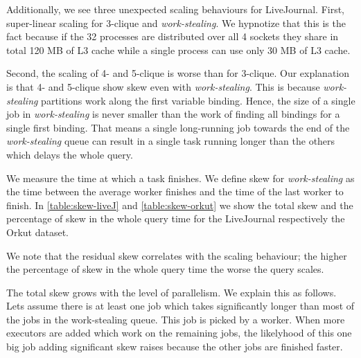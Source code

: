 Additionally, we see three unexpected scaling behaviours for LiveJournal.
First, super-linear scaling for 3-clique and \textit{work-stealing}.
We hypnotize that this is the fact because if the 32 processes are distributed over all 4 sockets they share in total
120 MB of L3 cache while a single process can use only 30 MB of L3 cache.

Second, the scaling of 4- and 5-clique is worse than for 3-clique.
Our explanation is that 4- and 5-clique show skew even with \textit{work-stealing}.
%
This is because \textit{work-stealing} partitions work along the first variable binding.
Hence, the size of a single job in \textit{work-stealing} is never smaller than the work of finding all bindings for a single
first binding.
That means a single long-running job towards the end of the \textit{work-stealing} queue can
result in a single task running longer than the others which delays the whole query.

We measure the time at which a task finishes.
We define skew for \textit{work-stealing} as the time between the average worker finishes and
the time of the last worker to finish.
In \cref{table:skew-liveJ} and \cref{table:skew-orkut} we show the total skew and the percentage of
skew in the whole query time for the LiveJournal respectively the Orkut dataset.

We note that the residual skew correlates with the scaling behaviour;
the higher the percentage of skew in the whole query time the worse the query scales.

The total skew grows with the level of parallelism.
We explain this as follows.
Lets assume there is at least one job which takes significantly longer than most of the jobs in
the work-stealing queue.
This job is picked by a worker.
When more executors are added which work on the remaining jobs, the likelyhood of this one big
job adding significant skew raises because the other jobs are finished faster.

